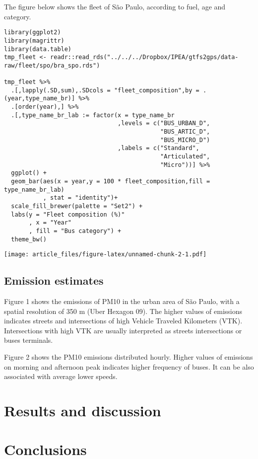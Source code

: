 \documentclass[gc, manuscript]{copernicus}
\begin{document}
The figure below shows the fleet of São Paulo, according to fuel, age
and category.

\begin{verbatim}
library(ggplot2)
library(magrittr)
library(data.table)
tmp_fleet <- readr::read_rds("../../../Dropbox/IPEA/gtfs2gps/data-raw/fleet/spo/bra_spo.rds")

tmp_fleet %>% 
  .[,lapply(.SD,sum),.SDcols = "fleet_composition",by = .(year,type_name_br)] %>% 
  .[order(year),] %>% 
  .[,type_name_br_lab := factor(x = type_name_br
                                ,levels = c("BUS_URBAN_D",
                                            "BUS_ARTIC_D",
                                            "BUS_MICRO_D")
                                ,labels = c("Standard", 
                                            "Articulated",
                                            "Micro"))] %>% 
  ggplot() + 
  geom_bar(aes(x = year,y = 100 * fleet_composition,fill = type_name_br_lab)
           , stat = "identity")+
  scale_fill_brewer(palette = "Set2") +
  labs(y = "Fleet composition (%)"
       , x = "Year"
       , fill = "Bus category") + 
  theme_bw()
\end{verbatim}

\texttt{[image: article\_files/figure-latex/unnamed-chunk-2-1.pdf]}

\subsection{Emission estimates}

Figure 1 shows the emissions of PM10 in the urban area of São Paulo,
with a spatial resolution of 350 m (Uber Hexagon 09). The higher values
of emissions indicates streets and intersections of high Vehicle
Traveled Kilometers (VTK). Intersections with high VTK are usually
interpreted as streets intersections or buses terminals.

Figure 2 shows the PM10 emissions distributed hourly. Higher values of
emissions on morning and afternoon peak indicates higher frequency of
buses. It can be also associated with average lower speeds.

\section{Results and discussion}

\section{Conclusions}
\end{document}

